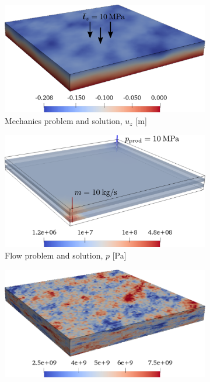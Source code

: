 \begin{figure} [htbp]
    \begin{subfigure}{0.48\textwidth}
        \includegraphics[width=0.9\linewidth]{figs/Cart/mech_sketch_v2}
	    \caption{Mechanics problem and solution, $u_z$ [m]}
        \label{fig:cart_mech_sketch}
    \end{subfigure}
    \hfill
    \begin{subfigure}{0.48\textwidth}
        \includegraphics[width=0.9\linewidth]{figs/Cart/flow_sketch}
	    \caption{Flow problem and solution, $p$ [Pa]}
        \label{fig:cart_flow_sketch}
    \end{subfigure}
    \par\bigskip
    \begin{subfigure}{0.48\textwidth}
        \includegraphics[width=0.9\linewidth]{figs/Cart/young}

\end{subfigure}
\end{figure}
